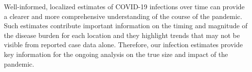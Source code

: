 

Well-informed, localized estimates of COVID-19 infections over time can provide
a clearer and more comprehensive understanding of the course of the pandemic.
Such estimates contribute important information on the timing and magnitude of
the disease burden for each location and they highlight trends that may not be
visible from reported case data alone. Therefore, our infection estimates
provide key information for the ongoing analysis on the true size and impact of
the pandemic.
